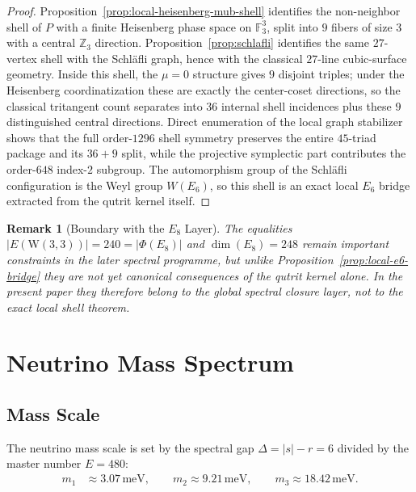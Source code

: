 \documentclass[12pt,a4paper]{article}
\newtheorem{remark}[theorem]{Remark}
\newcommand{\W}{\mathrm{W}(3,3)}
\begin{document}
\begin{proof}
Proposition~\ref{prop:local-heisenberg-mub-shell} identifies the non-neighbor
shell of $P$ with a finite Heisenberg phase space on $\mathbb{F}_3^3$, split
into $9$ fibers of size $3$ with a central $\mathbb{Z}_3$ direction.
Proposition~\ref{prop:schlafli} identifies the same $27$-vertex shell with the
Schl\"afli graph, hence with the classical $27$-line cubic-surface geometry.
Inside this shell, the $\mu=0$ structure gives $9$ disjoint triples; under the
Heisenberg coordinatization these are exactly the center-coset directions, so
the classical tritangent count separates into $36$ internal shell incidences
plus these $9$ distinguished central directions. Direct enumeration of the local
graph stabilizer shows that the full order-$1296$ shell symmetry preserves the
entire $45$-triad package and its $36+9$ split, while the projective symplectic
part contributes the order-$648$ index-$2$ subgroup. The automorphism group of the
Schl\"afli configuration is the Weyl group $W(E_6)$, so this shell is an exact
local $E_6$ bridge extracted from the qutrit kernel itself.
\end{proof}

\begin{remark}[Boundary with the $E_8$ Layer]
\label{rem:e8-boundary}
The equalities $|E(\W)| = 240 = |\Phi(E_8)|$ and $\dim(E_8)=248$ remain
important constraints in the later spectral programme, but unlike
Proposition~\ref{prop:local-e6-bridge} they are not yet canonical consequences
of the qutrit kernel alone. In the present paper they therefore belong to the
global spectral closure layer, not to the exact local shell theorem.
\end{remark}

\section{Neutrino Mass Spectrum}
\label{sec:neutrino}

\subsection{Mass Scale}

The neutrino mass scale is set by the spectral gap
$\Delta = |s| - r = 6$ divided by the master number $E = 480$:
\begin{align}
  m_1 &\approx 3.07\,\mathrm{meV},\qquad
  m_2  \approx 9.21\,\mathrm{meV},\qquad
  m_3  \approx 18.42\,\mathrm{meV}.
\end{align}
\end{document}
